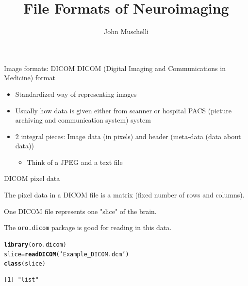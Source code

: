 \documentclass[11pt]{beamer}\usepackage[]{graphicx}\usepackage[]{color}
\author{John Muschelli}
\title{File Formats of Neuroimaging}
\institute{Johns Hopkins Bloomberg School of Public Health}
\makeatletter
\newcommand{\hlstr}[1]{\textcolor[rgb]{0.192,0.494,0.8}{#1}}%
\newcommand{\hlstd}[1]{\textcolor[rgb]{0.345,0.345,0.345}{#1}}%
\newcommand{\hlkwb}[1]{\textcolor[rgb]{0.69,0.353,0.396}{#1}}%
\newcommand{\hlkwd}[1]{\textcolor[rgb]{0.737,0.353,0.396}{\textbf{#1}}}%
\newenvironment{kframe}{%
 \def\at@end@of@kframe{}%
 \ifinner\ifhmode%
  \def\at@end@of@kframe{\end{minipage}}%
  \begin{minipage}{\columnwidth}%
 \fi\fi%
 \def\FrameCommand##1{\hskip\@totalleftmargin \hskip-\fboxsep
 \colorbox{shadecolor}{##1}\hskip-\fboxsep
     \hskip-\linewidth \hskip-\@totalleftmargin \hskip\columnwidth}%
 \MakeFramed {\advance\hsize-\width
   \@totalleftmargin\z@ \linewidth\hsize
   \@setminipage}}%
 {\par\unskip\endMakeFramed%
 \at@end@of@kframe}
\newenvironment{knitrout}{}{} %
\makeatother
\begin{document}
\begin{frame}
\titlepage
\end{frame}




\begin{frame}[fragile]{Image formats: DICOM}
DICOM (Digital Imaging and Communications in Medicine) format

\begin{itemize}
\item Standardized way of representing images
\item Usually how data is given either from scanner or hospital PACS (picture archiving and communication system) system 
\item 2 integral pieces: Image data (in pixels) and header (meta-data (data about data))
\begin{itemize}
	\item Think of a JPEG and a text file
\end{itemize}
\end{itemize}

\end{frame}


\begin{frame}[fragile]{DICOM pixel data}

The pixel data in a DICOM file is a matrix (fixed number of rows and columns). 

One DICOM file represents one "slice" of the brain.

The \verb|oro.dicom| package is good for reading in this data.

\begin{knitrout}
\color{fgcolor}\begin{kframe}
\begin{alltt}
\hlkwd{library}\hlstd{(oro.dicom)}
\hlstd{slice} \hlkwb{=} \hlkwd{readDICOM}\hlstd{(}\hlstr{'Example_DICOM.dcm'}\hlstd{)}
\hlkwd{class}\hlstd{(slice)}
\end{alltt}
\begin{verbatim}
[1] "list"
\end{verbatim}
\end{kframe}
\end{knitrout}

\end{frame}
\end{document}

